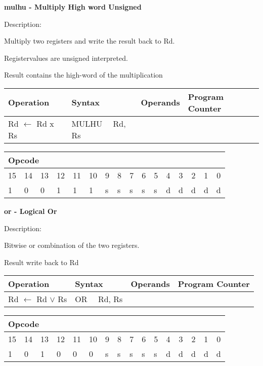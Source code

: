 \documentclass{article}
\begin{document}
\bigskip

\textbf{mulhu - Multiply High word Unsigned}

Description:

Multiply two registers and write the result back to Rd.

Registervalues are unsigned interpreted.

Result contains the high-word of the multiplication

\begin{tabular}{|l|l|l|l|}
\hline
Operation & Syntax & Operands & Program Counter \\ \hline
Rd $\leftarrow $ Rd x Rs & MULHU \ \ Rd, Rs &  &  \\ \hline
\end{tabular}

\begin{tabular}{|c|c|c|c|c|c|c|c|c|c|c|c|c|c|c|c|}
\hline
\multicolumn{6}{|l|}{Opcode} & \multicolumn{5}{|l|}{} & \multicolumn{5}{|l|}{
} \\ \hline
15 & 14 & 13 & 12 & 11 & 10 & 9 & 8 & 7 & 6 & 5 & 4 & 3 & 2 & 1 & 0 \\ \hline
\multicolumn{1}{|l|}{1} & \multicolumn{1}{|l|}{0} & \multicolumn{1}{|l|}{0}
& \multicolumn{1}{|l|}{1} & \multicolumn{1}{|l|}{1} & \multicolumn{1}{|l|}{1}
& \multicolumn{1}{|l|}{s} & \multicolumn{1}{|l|}{s} & \multicolumn{1}{|l|}{s}
& \multicolumn{1}{|l|}{s} & \multicolumn{1}{|l|}{s} & \multicolumn{1}{|l|}{d}
& \multicolumn{1}{|l|}{d} & \multicolumn{1}{|l|}{d} & \multicolumn{1}{|l|}{d}
& \multicolumn{1}{|l|}{d} \\ \hline
\end{tabular}

\bigskip

\textbf{or - Logical Or}

Description:

Bitwise or combination of the two registers.

Result write back to Rd

\begin{tabular}{|l|l|l|l|}
\hline
Operation & Syntax & Operands & Program Counter \\ \hline
Rd $\leftarrow $ Rd $\vee $ Rs & OR \ \ Rd, Rs &  &  \\ \hline
\end{tabular}

\begin{tabular}{|c|c|c|c|c|c|c|c|c|c|c|c|c|c|c|c|}
\hline
\multicolumn{6}{|l|}{Opcode} & \multicolumn{5}{|l|}{} & \multicolumn{5}{|l|}{
} \\ \hline
15 & 14 & 13 & 12 & 11 & 10 & 9 & 8 & 7 & 6 & 5 & 4 & 3 & 2 & 1 & 0 \\ \hline
\multicolumn{1}{|l|}{1} & \multicolumn{1}{|l|}{0} & \multicolumn{1}{|l|}{1}
& \multicolumn{1}{|l|}{0} & \multicolumn{1}{|l|}{0} & \multicolumn{1}{|l|}{0}
& \multicolumn{1}{|l|}{s} & \multicolumn{1}{|l|}{s} & \multicolumn{1}{|l|}{s}
& \multicolumn{1}{|l|}{s} & \multicolumn{1}{|l|}{s} & \multicolumn{1}{|l|}{d}
& \multicolumn{1}{|l|}{d} & \multicolumn{1}{|l|}{d} & \multicolumn{1}{|l|}{d}
& \multicolumn{1}{|l|}{d} \\ \hline
\end{tabular}
\end{document}
